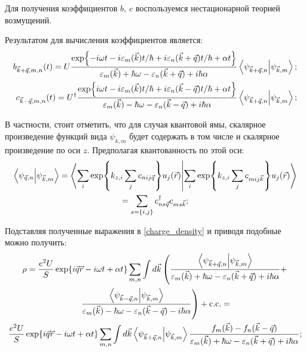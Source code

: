 \documentclass[../main.tex]{subfiles}
\begin{document}
    Для получения коэффициентов $b,~c$ воспользуемся нестационарной 
    теорией возмущений.

    Результатом для вычисления коэффициентов является:
    \begin{equation}
        \label{plasmons:charge:coeffs}
        \begin{aligned}
            b_{\vec k + \vec q, m, n} (t) = U \frac{\exp{-i\omega t - i 
                \varepsilon_m (\vec k) t / \hbar + i \varepsilon_n(\vec k 
                + \vec q) t / \hbar + \alpha t}}{\varepsilon_m (\vec k) + \hbar 
                \omega - \varepsilon_n(\vec k + \vec q)+ i \hbar \alpha}
                \bra{\psi_{\vec k+\vec q, n}}\ket{\psi_{\vec k, m}}; \\
            c_{\vec k - \vec q, m, n} (t) = U^\dagger \frac{\exp{i\omega t - i 
                \varepsilon_m (\vec k) t / \hbar + i \varepsilon_n(\vec k 
                - \vec q) t / \hbar + \alpha t}}{\varepsilon_m (\vec k) - \hbar 
                \omega - \varepsilon_n(\vec k - \vec q)+ i \hbar \alpha}
                \bra{\psi_{\vec k+\vec q, n}}\ket{\psi_{\vec k, m}};
        \end{aligned}
    \end{equation}

    В частности, стоит отметить, что для случая квантовой ямы, скалярное 
    произведение функций вида $\psi_{k, m}$ будет содержать в том числе 
    и скалярное произведение по оси $z$. Предполагая квантованность по 
    этой оси:
    \begin{multline}
        \bra{\psi_{\vec q, n}}\ket{\psi_{\vec k, m}} = 
            \bra{\sum_i \exp{k_{z,i} \sum_j c_{nij \vec q}} u_j(\vec r)}
            \ket{\sum_i \exp{k_{z,i} \sum_j c_{mij \vec k}} u_j(\vec r)}\\ 
            = \sum_{s=\{i,j\}}  c^\dagger_{ns \vec q} c_{ms \vec k};
    \end{multline}

    Подставляя полученные выражения в \ref{charge_density} 
    и приводя подобные можно получить:
    \begin{multline}
        \rho = \frac{e^2 U}{S} \exp{i\vec q \vec r - i \omega t + \alpha t}
            \sum_{m, n} \int d\vec k \left( \frac{\bra{\psi_{\vec k + \vec q, n}}
            \ket{\psi_{\vec k, m}}}{\varepsilon_m(\vec k) + \hbar \omega - 
            \varepsilon_n(\vec k + \vec q) + i \hbar \alpha} +\right. \\ 
            \left. \frac{\bra{\psi_{\vec k - \vec q, n}}
            \ket{\psi_{\vec k, m}}}{\varepsilon_m(\vec k) - \hbar \omega - 
            \varepsilon_n(\vec k - \vec q) - i \hbar \alpha} \right) + \text{c.c.}=\\
            \frac{e^2 U}{S} \exp{i\vec q \vec r - i \omega t + \alpha t}
            \sum_{m, n} \int d\vec k \bra{\psi_{\vec k + \vec q, n}}
            \ket{\psi_{\vec k, m}} \frac{f_m(\vec k) - f_n(\vec k - \vec q)}
            {\varepsilon_m(\vec k) + \hbar \omega - \varepsilon_n(\vec k + \vec q) 
            + i \hbar \alpha};
    \end{multline}
\end{document}
